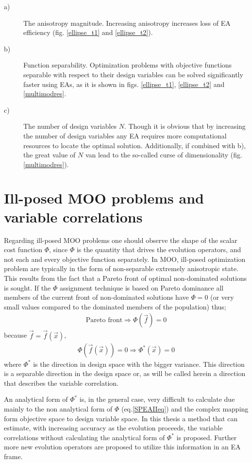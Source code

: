 \begin{description}
  \item[a)] The anisotropy magnitude. Increasing anisotropy increases loss of EA efficiency (fig. \ref{ellipse_t1} and \ref{ellipse_t2}).    
  \item[b)] Function separability. Optimization problems with objective functions separable with respect to their design variables can be solved significantly faster using EAs, as it is shown in figs. \ref{ellipse_t1}, \ref{ellipse_t2} and \ref{multimodres}.  
  \item[c)] The number of design variables $N$. Though it is obvious that by increasing the number of design variables any EA requires more computational resources to locate the optimal solution. Additionally, if combined with b), the great value of $N$ van lead to the so-called curse of dimensionality (fig. \ref{multimodres}).  
\end{description}

\section{Ill-posed MOO problems and variable correlations}
\label{VCMM}
Regarding ill-posed MOO problems one should observe the shape of the scalar cost function $\Phi$, since $\Phi$ is the quantity that drives the evolution operators, and not each and every objective function separately. In MOO, ill-posed optimization problem are typically in the form of non-separable extremely anisotropic state. This results from the fact that a Pareto front of optimal non-dominated solutions is sought. If the $\Phi$ assignment technique is based on Pareto dominance all members of the current front of non-dominated solutions have $\Phi=0$ (or very small values compared to the dominated members of the population) thus;
\begin{eqnarray}
   \mbox{Pareto front} \Rightarrow 	\Phi(\vec{f})=0  
   \label{Corr-Par} 
\end{eqnarray}
because $\vec{f}=\vec{f}(\vec{x})$,
\begin{eqnarray}
	\Phi(\vec{f}(\vec{x}))=0 \Rightarrow \Phi^*(\vec{x})=0
    \label{Corr-Par2}
\end{eqnarray}
where $\Phi^*$ is the direction in design space with the bigger variance. This direction is a separable direction in the design space or, as will be called herein a direction that describes the variable correlation.   

An analytical form of $\Phi^*$ is, in the general case, very difficult to calculate due mainly to the non analytical form of $\Phi$ (eq.\ref{SPEAIIeq}) and the complex mapping form objective space to design variable space. In this thesis a method that can estimate, with increasing accuracy as the evolution proceeds, the variable correlations without calculating the analytical form of $\Phi^*$ is proposed. Further more new evolution operators are proposed to utilize this information in an EA frame.  

